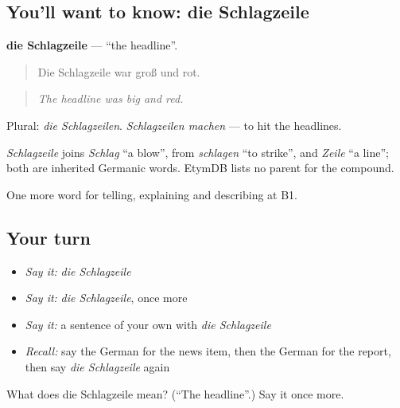 \subsection*{You'll want to know: die Schlagzeile}
\textbf{die Schlagzeile} — \textquotedblleft{}the headline\textquotedblright{}.

\begin{quote}
Die Schlagzeile war groß und rot.
\end{quote}

\begin{quote}
\emph{The headline was big and red.}
\end{quote}

Plural: \emph{die Schlagzeilen}. \emph{Schlagzeilen machen} — to hit the headlines.

\begin{cousinweb}
\emph{Schlagzeile} joins \emph{Schlag} \textquotedblleft{}a blow\textquotedblright{}, from \emph{schlagen} \textquotedblleft{}to strike\textquotedblright{}, and \emph{Zeile} \textquotedblleft{}a line\textquotedblright{}; both are inherited Germanic words. EtymDB lists no parent for the compound.
\end{cousinweb}

\begin{grammarlens}[title={What you've built}]
One more word for telling, explaining and describing at B1.
\end{grammarlens}

\subsection*{Your turn}
\begin{itemize}
\raggedright
  \item \emph{Say it:} \emph{die Schlagzeile}
  \item \emph{Say it:} \emph{die Schlagzeile}, once more
  \item \emph{Say it:} a sentence of your own with \emph{die Schlagzeile}
  \item \emph{Recall:} say the German for the news item, then the German for the report, then say \emph{die Schlagzeile} again
\end{itemize}

\begin{tcolorbox}[breakable,colback=teal!4,colframe=teal!35!black,title={Before you move on}]
What does die Schlagzeile mean? (\textquotedblleft{}The headline\textquotedblright{}.) Say it once more.
\end{tcolorbox}
